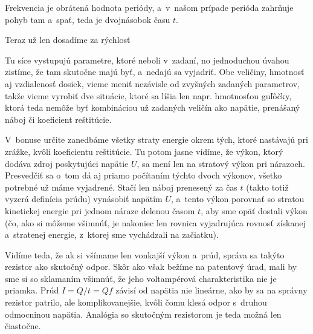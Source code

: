 {Frekvencia je obrátená hodnota periódy, a~v~našom prípade perióda zahrňuje pohyb 
tam a~spať, teda je dvojnásobok času $t$.
 
Teraz už len dosadíme za rýchlosť 
 
Tu síce vystupujú parametre, ktoré neboli v~zadaní, no jednoduchou 
úvahou zistíme, že tam skutočne majú byť, a~nedajú sa vyjadriť. 
Obe veličiny, hmotnosť aj vzdialenosť dosiek, vieme meniť nezávisle od 
zvyšných zadaných parametrov, takže vieme vyrobiť dve situácie, 
ktoré sa líšia len napr. hmotnosťou guľôčky, ktorá teda nemôže byť 
kombináciou už zadaných veličín ako napätie, prenášaný náboj či 
koeficient reštitúcie.
 
V~bonuse určite zanedbáme všetky straty energie okrem tých, ktoré 
nastávajú pri zrážke, kvôli koeficientu reštitúcie. Tu potom jasne 
vidíme, že výkon, ktorý dodáva zdroj poskytujúci napätie $U$, sa 
mení len na stratový výkon pri nárazoch. Presvedčiť sa o~tom 
dá aj priamo počítaním týchto dvoch výkonov, všetko potrebné už 
máme vyjadrené. Stačí len náboj prenesený za čas $t$ (takto totiž 
vyzerá definícia prúdu) vynásobiť napätím $U$, a~tento výkon porovnať 
so stratou kinetickej energie pri jednom náraze delenou časom $t$, 
aby sme opäť dostali výkon (čo, ako si môžeme všimnúť, je nakoniec 
len rovnica vyjadrujúca rovnosť získanej a~stratenej energie, z~ktorej 
sme vychádzali na začiatku).

Vidíme teda, že ak si všímame len vonkajší výkon a~prúd, správa sa 
takýto rezistor ako skutočný odpor. Skôr ako však bežíme na patentový 
úrad, mali by sme si so sklamaním všimnúť, že jeho voltampérová 
charakteristika nie je priamka. Prúd $I=Q/t=Qf$ závisí od napätia 
nie lineárne, ako by sa na správny rezistor patrilo, ale komplikovanejšie, 
kvôli čomu klesá odpor s~druhou odmocninou napätia. Analógia so skutočným 
rezistorom je teda možná len čiastočne.
}

